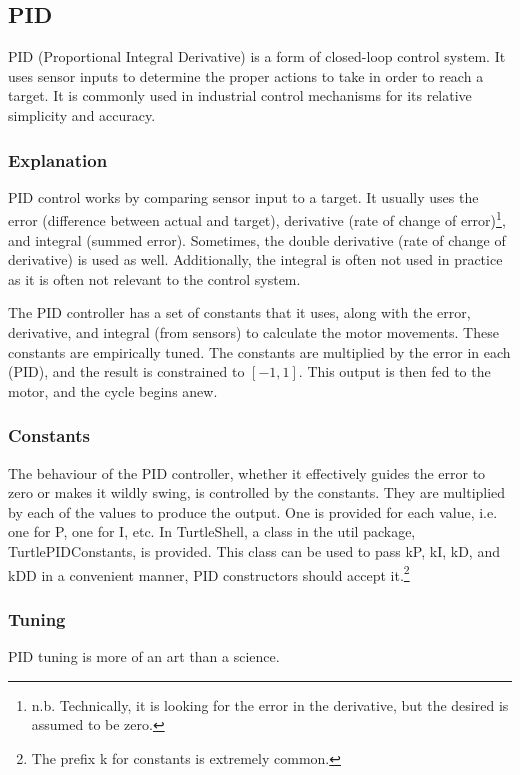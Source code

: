 \documentclass[]{report}
\begin{document}
\subsection{PID}
PID (Proportional Integral Derivative) is a form of closed-loop control system.
It uses sensor inputs to determine the proper actions to take in order to reach a target.
It is commonly used in industrial control mechanisms for its relative simplicity and accuracy.

\subsubsection{Explanation}
PID control works by comparing sensor input to a target.
It usually uses the error (difference between actual and target), derivative (rate of change of error)\footnote{n.b. Technically,
it is looking for the error in the derivative, but the desired is assumed to be zero.}, and integral (summed error).
Sometimes, the double derivative (rate of change of derivative) is used as well.
Additionally, the integral is often not used in practice as it is often not relevant to the control system.

The PID controller has a set of constants that it uses, along with the error, derivative, and integral (from sensors) to calculate the motor movements.
These constants are empirically tuned.
The constants are multiplied by the error in each (PID), and the result is constrained to $[-1,1]$.
This output is then fed to the motor, and the cycle begins anew.

\subsubsection{Constants}
The behaviour of the PID controller, whether it effectively guides the error to zero or makes it wildly swing, is controlled by the constants.
They are multiplied by each of the values to produce the output.
One is provided for each value, i.e. one for P, one for I, etc.
In TurtleShell, a class in the util package, TurtlePIDConstants, is provided.
This class can be used to pass kP, kI, kD, and kDD in a convenient manner, PID constructors should accept it.\footnote{The prefix k for constants is extremely common.}

\subsubsection{Tuning}
PID tuning is more of an art than a science.
\end{document}
